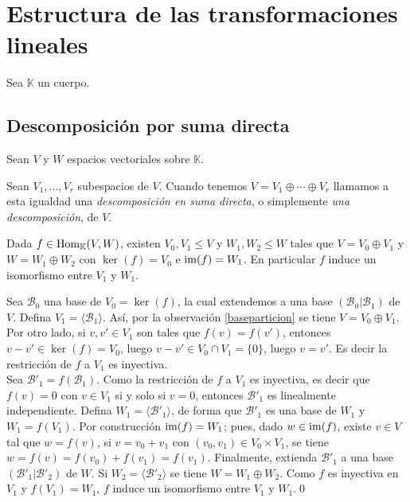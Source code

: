 \chapter{Estructura de las transformaciones lineales}

Sea $\mathbb{K}$ un cuerpo.

\section{Descomposici\'on por suma directa}

Sean $V$ y $W$ espacios vectoriales sobre $\mathbb{K}$.

\begin{defn}
  Sean $V_1,\ldots,V_r$ subespacios de $V$. Cuando tenemos $V=V_1\oplus\cdots\oplus V_r$ llamamos a esta igualdad una \emph{descomposición en suma directa}, o simplemente \emph{una descomposición}, de $V$.
\end{defn}

\begin{teo}\label{descomposicionsumadirecta}
Dada $f\in\operatorname{Hom}_\mathbb{K}(V,W)$, existen $V_0,V_1\le V$ y $W_1,W_2\le W$ tales que $V=V_0\oplus V_1$ y $W=W_1\oplus W_2$ con $\ker(f)=V_0$ e $\operatorname{im}(f)=W_1$. En particular $f$ induce un isomorfismo entre $V_1$ y $W_1$.
\end{teo}

\dem Sea $\mathcal{B}_0$ una base de $V_0=\ker(f)$, la cual extendemos a una base $\left(\mathcal{B}_0| \mathcal{B}_1\right)$ de $V$. Defina $V_1=\langle \mathcal{B}_1\rangle$. As\'i, por la observación \ref{baseparticion} se tiene $V=V_0\oplus V_1$. Por otro lado, si $v,v'\in V_1$ son tales que $f(v)=f(v')$, entonces $v-v'\in \ker(f)=V_0$, luego $v-v'\in V_0\cap V_1=\{0\}$, luego $v=v'$. Es decir la restricci\'on de $f$ a $V_1$ es inyectiva.\\
Sea $\mathcal{B}'_1=f(\mathcal{B}_1)$. Como la restricción de $f$ a $V_1$ es inyectiva, es decir que $f(v)=0$ con $v\in V_1$ si y solo si $v=0$, entonces $\mathcal{B}'_1$ es linealmente independiente. Defina $W_1=\langle \mathcal{B}'_1\rangle$, de forma que $\mathcal{B}'_1$ es una base de $W_1$ y $W_1=f(V_1)$. Por construcci\'on $\operatorname{im}(f)=W_1$; pues, dado $w\in\operatorname{im}(f)$, existe $v\in V$ tal que $w=f(v)$, si $v=v_0+v_1$ con $(v_0,v_1)\in V_0\times V_1$, se tiene $w=f(v)=f(v_0)+f(v_1)=f(v_1)$. Finalmente, extienda $\mathcal{B}'_1$ a una base $\left(\mathcal{B}'_1| \mathcal{B}'_2\right)$ de $W$. Si $W_2=\langle \mathcal{B}'_2\rangle$ se tiene $W=W_1\oplus W_2$. Como $f$ es inyectiva en $V_1$ y $f(V_1)=W_1$, $f$ induce un isomorfismo entre $V_1$ y $W_1$.\qed

